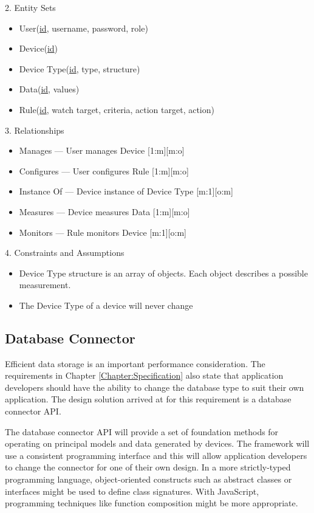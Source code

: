       2. Entity Sets
      \begin{itemize}
        \item User(\underline{id}, username, password, role)
        \item Device(\underline{id})
        \item Device Type(\underline{id}, type, structure)
        \item Data(\underline{id}, values)
        \item Rule(\underline{id}, watch target, criteria, action target, action)
      \end{itemize}

      3. Relationships
      \begin{itemize}
        \item Manages --- User manages Device [1:m][m:o]
        \item Configures --- User configures Rule [1:m][m:o]
        \item Instance Of --- Device instance of Device Type [m:1][o:m]
        \item Measures --- Device measures Data [1:m][m:o]
        \item Monitors --- Rule monitors Device [m:1][o:m]
      \end{itemize}

      4. Constraints and Assumptions
      \begin{itemize}
        \item Device Type structure is an array of objects. Each object describes a possible measurement.
        \item The Device Type of a device will never change
      \end{itemize}
    \subsection{Database Connector}
    \label{section:database-connector}
      Efficient data storage is an important performance consideration. The requirements in Chapter \ref{Chapter:Specification} also state that application developers should have the ability to change the database type to suit their own application. The design solution arrived at for this requirement is a database connector API.

      The database connector API will provide a set of foundation methods for operating on principal models and data generated by devices. The framework will use a consistent programming interface and this will allow application developers to change the connector for one of their own design. In a more strictly-typed programming language, object-oriented constructs such as abstract classes or interfaces might be used to define class signatures. With JavaScript, programming techniques like function composition might be more appropriate. 

